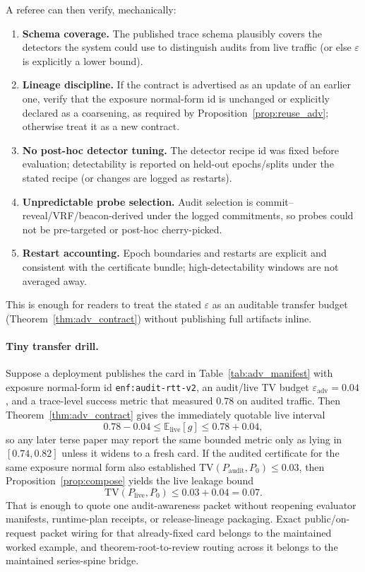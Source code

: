 \documentclass[11pt]{article}
\newcommand{\TV}{\mathrm{TV}}
\newcommand{\E}{\mathbb{E}}
\begin{document}
A referee can then verify, mechanically:
\begin{enumerate}
\item \textbf{Schema coverage.} The published trace schema plausibly covers the detectors the system could use to distinguish audits from live traffic (or else $\varepsilon$ is explicitly a lower bound).
\item \textbf{Lineage discipline.} If the contract is advertised as an update of an earlier one, verify that the exposure normal-form id is unchanged or explicitly declared as a coarsening, as required by Proposition~\ref{prop:reuse_adv}; otherwise treat it as a new contract.
\item \textbf{No post-hoc detector tuning.} The detector recipe id was fixed before evaluation; detectability is reported on held-out epochs/splits under the stated recipe (or changes are logged as restarts).
\item \textbf{Unpredictable probe selection.} Audit selection is commit--reveal/VRF/beacon-derived under the logged commitments, so probes could not be pre-targeted or post-hoc cherry-picked.
\item \textbf{Restart accounting.} Epoch boundaries and restarts are explicit and consistent with the certificate bundle; high-detectability windows are not averaged away.
\end{enumerate}
This is enough for readers to treat the stated $\varepsilon$ as an auditable transfer budget (Theorem~\ref{thm:adv_contract}) without publishing full artifacts inline.

\paragraph{Tiny transfer drill.}
Suppose a deployment publishes the card in Table~\ref{tab:adv_manifest} with exposure normal-form id \texttt{enf:audit-rtt-v2}, an audit/live TV budget $\varepsilon_{\mathrm{adv}}=0.04$, and a trace-level success metric that measured $0.78$ on audited traffic.
Then Theorem~\ref{thm:adv_contract} gives the immediately quotable live interval
\[
0.78 - 0.04 \le \E_{\mathrm{live}}[g] \le 0.78 + 0.04,
\]
so any later terse paper may report the same bounded metric only as lying in $[0.74,0.82]$ unless it widens to a fresh card.
If the audited certificate for the same exposure normal form also established $\TV(P_{\mathrm{audit}},P_0)\le 0.03$, then Proposition~\ref{prop:compose} yields the live leakage bound
\[
\TV(P_{\mathrm{live}},P_0) \le 0.03 + 0.04 = 0.07.
\]
That is enough to quote one audit-awareness packet without reopening evaluator manifests, runtime-plan receipts, or release-lineage packaging. Exact public/on-request packet wiring for that already-fixed card belongs to the maintained worked example, and theorem-root-to-review routing across it belongs to the maintained series-spine bridge.\cite{series:workedexample,series:seriesspines}
\end{document}
